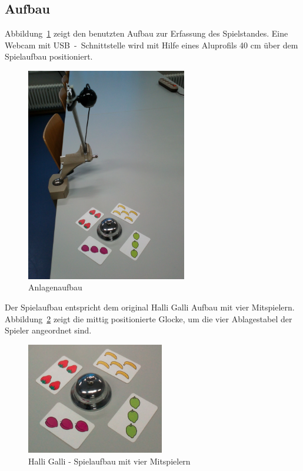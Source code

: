 \subsection{Aufbau}
\label{sub:Aufbau}

Abbildung~\ref{fig:Anlage} zeigt den benutzten Aufbau zur Erfassung des Spielstandes. Eine Webcam mit USB~-~Schnittstelle wird mit Hilfe eines Aluprofils 40 cm über dem Spielaufbau positioniert.

\begin{figure}[]
    \centering
    \includegraphics[width=7cm]{Abbildungen/KameraAufbau}
    \caption[Anlage]{Anlagenaufbau}
    \label{fig:Anlage}
\end{figure}

Der Spielaufbau entspricht dem original Halli Galli Aufbau mit vier Mitspielern. Abbildung~\ref{fig:Spielaufbau} zeigt die mittig positionierte Glocke, um die vier Ablagestabel der Spieler angeordnet sind.\\

\begin{figure}[h]
    \centering
    \includegraphics[width=6cm]{Abbildungen/Aufbau4}
    \caption[Spielaufbau]{Halli Galli - Spielaufbau mit vier Mitspielern}
    \label{fig:Spielaufbau}
\end{figure}


